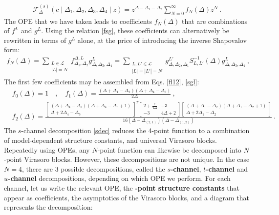 \documentclass[12pt, a4paper]{article}
\newcommand{\myindex}[1]{\textbf{\boldmath #1}}
\begin{document}
\begin{align}
 \mathcal{F}_{\Delta}^{(s)}\left(c\middle|\Delta_1,\Delta_2,\Delta_3,\Delta_4\middle|z\right) =  z^{\Delta-\Delta_1-\Delta_2}\sum_{N=0}^\infty f_N(\Delta)z^N \ .
 \label{fsl}
\end{align}
The OPE that we have taken leads to coefficients $f_N(\Delta)$ that are combinations of $f^L$ and $g^L$. Using the relation \eqref{fsg}, these coefficients can alternatively be rewritten in terms of $g^L$ alone, at the price of introducing the inverse Shapovalov form:
\begin{align}
 f_N(\Delta) = \sum_{\substack{L\in\mathcal{L} \\ |L|=N}} f_{\Delta_1,\Delta_2}^{\Delta,L}g^L_{\Delta,\Delta_3,\Delta_4} = \sum_{\substack{L,L'\in\mathcal{L} \\ |L|=|L'|=N}} g^{L'}_{\Delta,\Delta_2,\Delta_1} S_{L,L'}^{-1}(\Delta) g^L_{\Delta,\Delta_3,\Delta_4} \ ,
 \label{fnd}
\end{align}
The first few coefficients may be assembled from Eqs. \eqref{fl12}, \eqref{sgl}:
\begin{subequations}
\begin{align}
& f_0(\Delta) = 1 \quad , \quad f_1(\Delta) = \frac{(\Delta+\Delta_1-\Delta_2)(\Delta+\Delta_4-\Delta_3)}{2\Delta} \ ,
\\
& f_2(\Delta) =  \frac{\left[\begin{smallmatrix} (\Delta+\Delta_4-\Delta_3)(\Delta+\Delta_4-\Delta_3+1) \\ \Delta+2\Delta_4-\Delta_3 \end{smallmatrix}\right]^T
\left[\begin{smallmatrix} 2+\frac{c}{4\Delta} & -3 \\ -3 & 4\Delta+2 \end{smallmatrix}\right]
\left[\begin{smallmatrix} (\Delta+\Delta_1-\Delta_2)(\Delta+\Delta_1-\Delta_2+1) \\ \Delta+2\Delta_1-\Delta_2 \end{smallmatrix}\right]}{16(\Delta-\Delta_{(2,1)})(\Delta-\Delta_{(1,2)})}
 \ .
 \label{f2d}
\end{align}
\end{subequations}
The $s$-channel decomposition \eqref{sdec} reduces the 4-point function to a combination of model-dependent structure constants, and universal Virasoro blocks. Repeatedly using OPEs, any $N$-point function can likewise be decomposed into $N$-point Virasoro blocks. However, these decompositions are not unique. In the case $N=4$, there are 3 possible decompositions, called the \myindex{$s$-channel}, \myindex{$t$-channel} and \myindex{$u$-channel} decompositions, depending on which OPE we perform. For each channel, let us write the relevant OPE, the \myindex{4-point structure constants} that appear as coefficients, the asymptotics of the Virasoro blocks, and a diagram that represents the decomposition:
\end{document}
